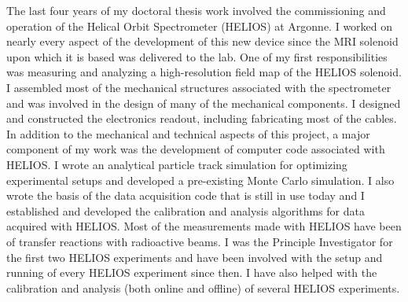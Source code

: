 {The last four years of my doctoral thesis work involved the %
commissioning and operation of the Helical Orbit Spectrometer (HELIOS) at Argonne.  I worked on nearly every aspect of the development of this new device since the MRI solenoid upon which it is based was delivered to the lab.  One of my first responsibilities was measuring and analyzing a high-resolution field map of the HELIOS solenoid.  I assembled most of the mechanical structures associated with the spectrometer and was involved in the design of many of the mechanical components.
I designed and constructed the electronics readout, including fabricating most of the cables.
In addition to the mechanical and technical aspects of this project, a major component of my work was the development of computer code associated with %
HELIOS.  I wrote an analytical particle track simulation for optimizing experimental setups and developed a pre-existing Monte Carlo simulation.  I also wrote the basis of the data acquisition code that is still in use today and I established and developed the calibration and analysis algorithms for data acquired with HELIOS.  Most of the measurements made with HELIOS have been of transfer reactions with radioactive beams.  I was the Principle Investigator for the first two HELIOS experiments and have been involved with the setup and running of every HELIOS experiment since then. %
I have also helped with the calibration and analysis (both online and offline) of several HELIOS experiments.
}